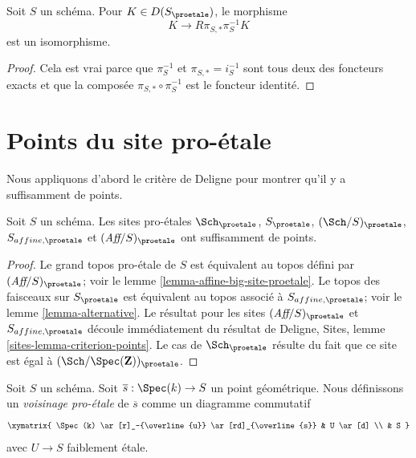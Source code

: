 \begin{lemma}
\label{lemma-cohomological-descent-proetale}
Soit $S$ un schéma. Pour $K \in D(S_\proetale)$, le morphisme
$$
K \longrightarrow R\pi_{S, *}\pi_S^{-1}K
$$
est un isomorphisme.
\end{lemma}

\begin{proof}
Cela est vrai parce que $\pi_S^{-1}$ et $\pi_{S, *} = i_S^{-1}$ sont tous deux
des foncteurs exacts et que la composée $\pi_{S, *} \circ \pi_S^{-1}$
est le foncteur identité.
\end{proof}






















\section{Points du site pro-\'etale}
\label{section-points}

\noindent
Nous appliquons d'abord le critère de Deligne pour montrer qu'il y a suffisamment de points.

\begin{lemma}
\label{lemma-points-proetale}
Soit $S$ un schéma. Les sites pro-\'etales $\Sch_\proetale$,
$S_\proetale$, $(\Sch/S)_\proetale$, $S_{affine, \proetale}$ et
$(\textit{Aff}/S)_\proetale$ ont suffisamment de points.
\end{lemma}

\begin{proof}
Le grand topos pro-\'etale de $S$ est équivalent au topos défini par
$(\textit{Aff}/S)_\proetale$; voir le
lemme \ref{lemma-affine-big-site-proetale}.
Le topos des faisceaux sur $S_\proetale$ est équivalent au topos
associé à $S_{affine, \proetale}$; voir le
lemme \ref{lemma-alternative}.
Le résultat pour les sites $(\textit{Aff}/S)_\proetale$ et
$S_{affine, \proetale}$ découle immédiatement du résultat de Deligne,
Sites, lemme \ref{sites-lemma-criterion-points}.
Le cas de $\Sch_\proetale$ résulte du fait que ce site est égal à
$(\Sch/\Spec(\mathbf{Z}))_\proetale$.
\end{proof}

\noindent
Soit $S$ un schéma. Soit $\overline{s} : \Spec(k) \to S$ un point
géométrique. Nous définissons un {\it voisinage pro-\'etale} de $\overline{s}$
comme un diagramme commutatif
$$
\xymatrix{
\Spec(k) \ar[r]_-{\overline{u}} \ar[rd]_{\overline{s}} & U \ar[d] \\
& S
}
$$
avec $U \to S$ faiblement \'etale.

